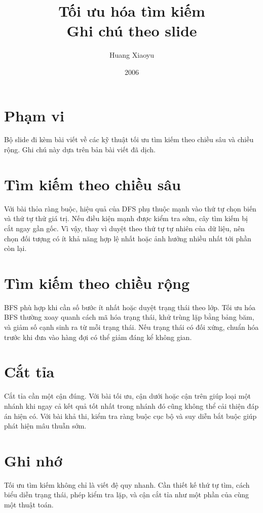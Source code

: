 \documentclass[11pt]{article}
\title{Tối ưu hóa tìm kiếm\\{\large Ghi chú theo slide}}
\author{Huang Xiaoyu}
\date{2006}
\begin{document}
\maketitle


\section{Phạm vi}

Bộ slide đi kèm bài viết về các kỹ thuật tối ưu tìm kiếm theo chiều sâu và
chiều rộng. Ghi chú này dựa trên bản bài viết đã dịch.

\section{Tìm kiếm theo chiều sâu}

Với bài thỏa ràng buộc, hiệu quả của DFS phụ thuộc mạnh vào thứ tự chọn biến
và thứ tự thử giá trị. Nếu điều kiện mạnh được kiểm tra sớm, cây tìm kiếm bị
cắt ngay gần gốc. Vì vậy, thay vì duyệt theo thứ tự tự nhiên của dữ liệu, nên
chọn đối tượng có ít khả năng hợp lệ nhất hoặc ảnh hưởng nhiều nhất tới phần
còn lại.

\section{Tìm kiếm theo chiều rộng}

BFS phù hợp khi cần số bước ít nhất hoặc duyệt trạng thái theo lớp. Tối ưu hóa
BFS thường xoay quanh cách mã hóa trạng thái, khử trùng lặp bằng bảng băm, và
giảm số cạnh sinh ra từ mỗi trạng thái. Nếu trạng thái có đối xứng, chuẩn hóa
trước khi đưa vào hàng đợi có thể giảm đáng kể không gian.

\section{Cắt tỉa}

Cắt tỉa cần một cận đúng. Với bài tối ưu, cận dưới hoặc cận trên giúp loại một
nhánh khi ngay cả kết quả tốt nhất trong nhánh đó cũng không thể cải thiện
đáp án hiện có. Với bài khả thi, kiểm tra ràng buộc cục bộ và suy diễn bắt
buộc giúp phát hiện mâu thuẫn sớm.

\section{Ghi nhớ}

Tối ưu tìm kiếm không chỉ là viết đệ quy nhanh. Cần thiết kế thứ tự tìm, cách
biểu diễn trạng thái, phép kiểm tra lặp, và cận cắt tỉa như một phần của cùng
một thuật toán.
\end{document}
